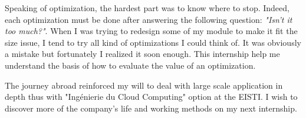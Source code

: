 \documentclass[a4paper,11pt]{report}
\begin{document}
Speaking of optimization, the hardest part was to know where to stop. Indeed, each optimization must be done after answering the following question: \textit{"Isn't it too much?"}. When I was trying to redesign some of my module to make it fit the size issue, I tend to try all kind of optimizations I could think of. It was obviously a mistake but fortunately I realized it soon enough. This internship help me understand the basis of how to evaluate the value of an optimization.

The journey abroad reinforced my will to deal with large scale application in depth thus with "Ingénierie du Cloud Computing" option at the EISTI. I wish to discover more of the company's life and working methods on my next internship.

\clearpage




\clearpage



\newpage

\end{document}
